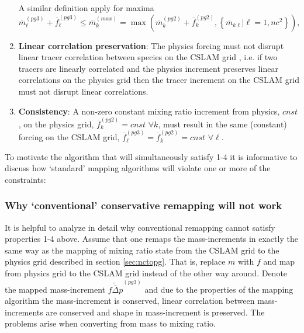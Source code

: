 \documentclass[draft,linenumbers]{agujournal}
\begin{document}
\begin{enumerate}
A similar definition apply for maxima
\begin{equation}
\label{eq:max}
{\overline{m}}^{(pg3)}_\ell+{\overline{f}}^{(pg3)}_\ell \le \overline{m}_k^{(max)}=\max \left( {\overline{m}}^{(pg2)}_k+\overline{f}_k^{(pg2)},\left\{ {\overline{m}}_{k\ell} |\ell=1,nc^2\right\} \right),
\end{equation}
\item {\bf{Linear correlation preservation}}: The physics forcing must not disrupt linear tracer correlation between species on the CSLAM grid \citep[see, e.g., ][]{LT2011QJR}, i.e. if two tracers are linearly correlated and the physics increment preserves linear correlations on the physics grid then the tracer increment on the CSLAM grid must not disrupt linear correlations.
\item {\bf{Consistency}}: A non-zero constant mixing ratio increment from physics, $cnst$, on the physics grid, $\overline{f}_k^{(pg2)}=cnst$ $\forall k$, must result in the same (constant) forcing on the CSLAM grid, $\overline{f}_\ell^{(pg3)}=\overline{f}_k^{(pg2)}=cnst$ $\forall \ell$.
\end{enumerate}
To motivate the algorithm that will simultaneously satisfy 1-4 it is informative to discuss how `standard' mapping algorithms will violate one or more of the constraints:
\subsubsection{Why `conventional' conservative remapping will not work}\label{sec:why}
It is helpful to analyze in detail why conventional remapping cannot satisfy properties 1-4 above. Assume that one remaps the mass-increments in exactly the same way as the mapping of mixing ratio state from the CSLAM grid to the physics grid described in section \ref{sec:nctopg}. That is, replace $m$ with $f$ and map from physics grid to the CSLAM grid instead of the other way around. Denote the mapped mass-increment $\widetilde{\overline{f\Delta p}}^{(pg3)}$ and due to the properties of the mapping algorithm the mass-increment is conserved, linear correlation between mass-increments are conserved and shape in mass-increment is preserved. The problems arise when converting from mass to mixing ratio.
\end{document}
